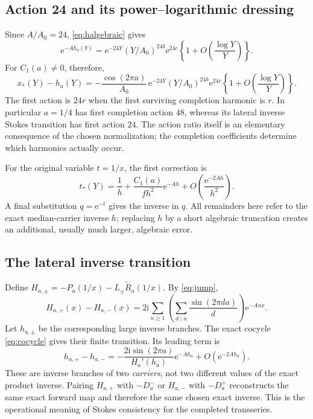 \documentclass[11pt,a4paper]{article}
\numberwithin{equation}{section}
\theoremstyle{definition}
\theoremstyle{remark}
\newcommand{\ii}{\mathrm i}
\newcommand{\e}{\mathrm e}
\newcommand{\wt}{\widetilde}
\begin{document}
\subsection{Action 24 and its power--logarithmic dressing}
Since $A/A_0=24$, \eqref{eq:halgebraic} gives
\begin{equation}
 \e^{-Ah_a(Y)}=
 \e^{-24Y}(Y/A_0)^{24b}\e^{24c}
 \left\{1+O\!\left(\frac{\log Y}{Y}\right)\right\}.
 \label{eq:action24}
\end{equation}
For $C_1(a)\ne0$, therefore,
\begin{equation}
 x_*(Y)-h_a(Y)
 =-\frac{\cos(2\pi a)}{A_0}\,
 \e^{-24Y}(Y/A_0)^{24b}\e^{24c}
 \left\{1+O\!\left(\frac{\log Y}{Y}\right)\right\}.
 \label{eq:inverseleading}
\end{equation}
The first action is $24r$ when the first surviving completion harmonic
is $r$. In particular $a=1/4$ has first completion action $48$, whereas
its lateral inverse Stokes transition has first action $24$. The
action ratio itself is an elementary consequence of the chosen
normalization; the completion coefficients determine which harmonics
actually occur.

For the original variable $t=1/x$, the first correction is
\begin{equation}
 t_*(Y)=\frac1h+\frac{C_1(a)}{f h^2}\e^{-Ah}
              +O\!\left(\frac{\e^{-2Ah}}{h^2}\right).
 \label{eq:tinverse}
\end{equation}
A final substitution $q=\e^{-t}$ gives the inverse in $q$. All
remainders here refer to the exact median-carrier inverse $h$;
replacing $h$ by a short algebraic truncation creates an additional,
usually much larger, algebraic error.

\subsection{The lateral inverse transition}
Define $H_{a,\pm}=-P_a(1/x)-L_\pm\wt R_a(1/x)$. By
\eqref{eq:jump},
\begin{equation}
 H_{a,+}(x)-H_{a,-}(x)
 =2\ii\sum_{n\geq1}\left(\sum_{d\mid n}\frac{\sin(2\pi da)}d\right)
          \e^{-Anx}.
 \label{eq:Hjump}
\end{equation}
Let $h_{a,\pm}$ be the corresponding large inverse branches. The exact
cocycle \eqref{eq:cocycle} gives their finite transition. Its leading
term is
\begin{equation}
 h_{a,+}-h_{a,-}
 =-\frac{2\ii\sin(2\pi a)}{H_a'(h_a)}\e^{-Ah_a}
       +O(\e^{-2Ah_a}).
 \label{eq:hjump}
\end{equation}
These are inverse branches of two \emph{carriers}, not two different
values of the exact product inverse. Pairing $H_{a,+}$ with $-D_a^-$
or $H_{a,-}$ with $-D_a^+$ reconstructs the same exact forward map and
therefore the same chosen exact inverse. This is the operational
meaning of Stokes consistency for the completed transseries.
\end{document}
